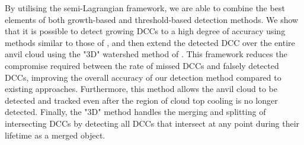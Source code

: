 By utilising the semi-Lagrangian framework, we are able to combine the best elements of both growth-based and threshold-based detection methods.
We show that it is possible to detect growing DCCs to a high degree of accuracy using methods similar to those of \citet{zinner_cb-tram:_2008}, and then extend the detected DCC over the entire anvil cloud using the "3D" watershed method of \citet{fiolleau_algorithm_2013}.
This framework reduces the compromise required between the rate of missed DCCs and falsely detected DCCs, improving the overall accuracy of our detection method compared to existing approaches.
Furthermore, this method allows the anvil cloud to be detected and tracked even after the region of cloud top cooling is no longer detected.
Finally, the "3D" method handles the merging and splitting of intersecting DCCs by detecting all DCCs that intersect at any point during their lifetime as a merged object.






